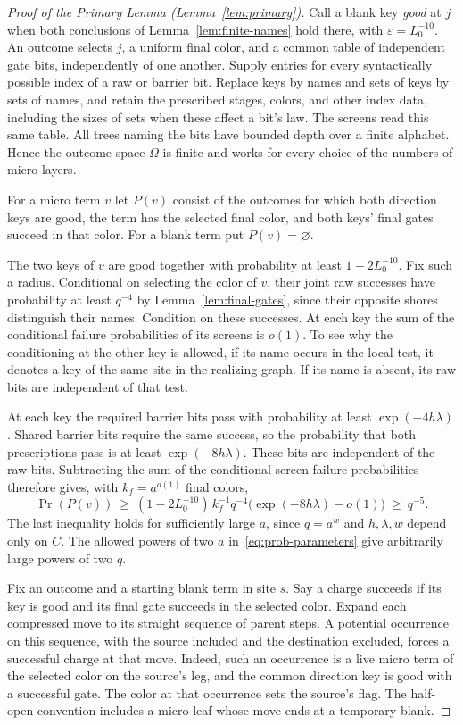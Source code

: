 \begin{proof}[Proof of the Primary Lemma (Lemma~\ref{lem:primary})]
Call a blank key \emph{good} at \(j\) when both conclusions of
Lemma~\ref{lem:finite-names} hold there, with
\(\varepsilon=L_0^{-10}\). An outcome selects \(j\), a uniform final color,
and a common table of independent gate bits, independently of one another.
Supply entries for every syntactically possible index of a raw or barrier
bit. Replace keys by names and sets of keys by sets of names, and retain
the prescribed stages, colors, and other index data, including the sizes
of sets when these affect a bit's law. The screens read this same table.
All trees naming the bits have bounded depth over a finite alphabet.
Hence the outcome space \(\Omega\) is finite and works for every choice
of the numbers of micro layers.

For a micro term \(v\) let \(P(v)\) consist of the outcomes for which
both direction keys are good, the term has the selected final color,
and both keys' final gates succeed in that color. For a blank term put
\(P(v)=\varnothing\).

The two keys of \(v\) are good together with probability at least
\(1-2L_0^{-10}\). Fix such a radius. Conditional on selecting the color
of \(v\), their joint raw successes have probability at least \(q^{-4}\)
by Lemma~\ref{lem:final-gates}, since their opposite shores distinguish
their names. Condition on these successes. At each key the sum of the
conditional failure probabilities of its screens is \(o(1)\). To see
why the conditioning at the other key is allowed, if its name occurs
in the local test, it denotes a key of the same site in the realizing
graph. If its name is absent, its raw bits are independent of that test.

At each key the required barrier bits pass with probability at least
\(\exp(-4h\lambda)\). Shared barrier bits require the same success, so
the probability that both prescriptions pass is at least
\(\exp(-8h\lambda)\). These bits are independent of the raw bits.
Subtracting the sum of the conditional screen failure probabilities
therefore gives, with \(k_f=a^{o(1)}\) final colors,
\[
 \Pr(P(v))\ \ge\ (1-2L_0^{-10})\,k_f^{-1}q^{-4}
       \bigl(\exp(-8h\lambda)-o(1)\bigr)\ \ge\ q^{-5}.
\]
The last inequality holds for sufficiently large \(a\), since \(q=a^w\)
and \(h,\lambda,w\) depend only on \(C\). The allowed powers of two \(a\)
in~\eqref{eq:prob-parameters} give arbitrarily large powers of two \(q\).

Fix an outcome and a starting blank term in site \(s\). Say a charge
succeeds if its key is good and its final gate succeeds in the selected
color. Expand each compressed move to its straight sequence of parent
steps. A potential occurrence on this sequence, with the source included
and the destination excluded, forces a successful charge at that move.
Indeed, such an occurrence is a live micro term of the selected color
on the source's leg, and the common direction key is good with
a successful gate. The color at that occurrence sets the source's flag.
The half-open convention includes a micro leaf whose move ends at a
temporary blank.


\end{proof}
